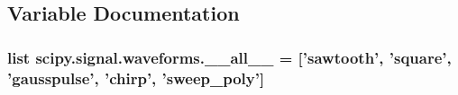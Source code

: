 \subsection{Variable Documentation}
\hypertarget{namespacescipy_1_1signal_1_1waveforms_a16ac485e01290339aabd90fa3e6f1cb5}{}
\subsubsection[{\+\_\+\+\_\+all\+\_\+\+\_\+}]{\setlength{\rightskip}{0pt plus 5cm}list scipy.\+signal.\+waveforms.\+\_\+\+\_\+all\+\_\+\+\_\+ = \mbox{[}'{\bf sawtooth}', '{\bf square}', '{\bf gausspulse}', '{\bf chirp}', '{\bf sweep\+\_\+poly}'\mbox{]}}\label{namespacescipy_1_1signal_1_1waveforms_a16ac485e01290339aabd90fa3e6f1cb5}
